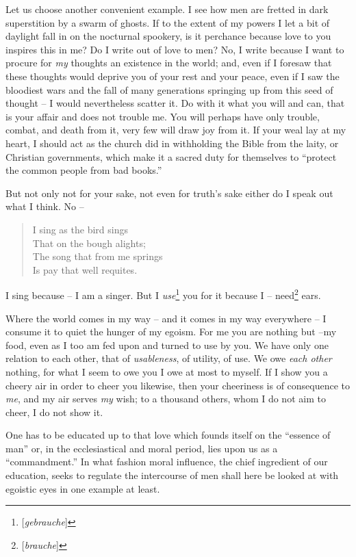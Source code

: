 Let us choose another convenient example. I see how men are fretted in dark 
superstition by a swarm of ghosts. If to the extent of my powers I let a bit 
of daylight fall in on the nocturnal spookery, is it perchance because love to 
you inspires this in me? Do I write out of love to men? No, I write because I 
want to procure for \textit{my} thoughts an existence in the world; and, even 
if I foresaw that these thoughts would deprive you of your rest and your 
peace, even if I saw the bloodiest wars and the fall of many generations 
springing up from this seed of thought -- I would nevertheless scatter it. Do 
with it what you will and can, that is your affair and does not trouble me. 
You will perhaps have only trouble, combat, and death from it, very few will 
draw joy from it. If your weal lay at my heart, I should act as the church did 
in withholding the Bible from the laity, or Christian governments, which make 
it a sacred duty for themselves to ``protect the common people from bad 
books.''

But not only not for your sake, not even for truth's sake either do I speak 
out what I think. No --

\begin{quotation}

\noindent{}I sing as the bird sings\\
 That on the bough alights;\\
 The song that from me springs\\
 Is pay that well requites.\end{quotation}

\noindent{}I sing because -- I am a singer. But I 
\textit{use}\footnote{[\textit{gebrauche}]} you for it because I -- 
need\footnote{[\textit{brauche}]} ears.

Where the world comes in my way -- and it comes in my way everywhere -- I 
consume it to quiet the hunger of my egoism. For me you are nothing but --my 
food, even as I too am fed upon and turned to use by you. We have only one 
relation to each other, that of \textit{usableness}, of utility, of use. We 
owe \textit{each other} nothing, for what I seem to owe you I owe at most to 
myself. If I show you a cheery air in order to cheer you likewise, then your 
cheeriness is of consequence to \textit{me}, and my air serves \textit{my} 
wish; to a thousand others, whom I do not aim to cheer, I do not show it.

\myhrule

One has to be educated up to that love which founds itself on the ``essence 
of man'' or, in the ecclesiastical and moral period, lies upon us as a 
``commandment.'' In what fashion moral influence, the chief ingredient of 
our education, seeks to regulate the intercourse of men shall here be looked 
at with egoistic eyes in one example at least.

